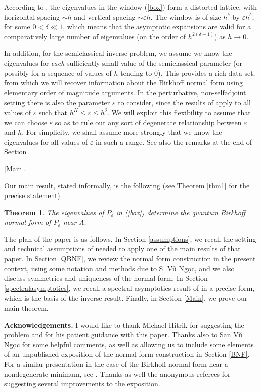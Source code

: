 \documentclass[12pt,lettersize]{article}
\renewcommand{\epsilon}{\varepsilon}
\theoremstyle{plain}%
\newtheorem{theorem}{Theorem}
\numberwithin{theorem}{section}
\numberwithin{equation}{section}
\theoremstyle{definition}
\theoremstyle{remark}
\begin{document}
According to \cite{HSV}, the eigenvalues in the window (\ref{box}) form a distorted lattice, with horizontal spacing $\sim h$ and vertical spacing $\sim \epsilon h$. The window is of size $h^\delta$ by $\epsilon h^\delta$, for some $0 < \delta \ll 1$, which means that the asymptotic expansions are valid for a comparatively large number of eigenvalues (on the order of $h^{2(\delta-1)}$) as $h \to 0$. 

In addition, for the semiclassical inverse problem, we assume we know the eigenvalues for \textit{each} sufficiently small value of the semiclassical parameter (or possibly for a sequence of values of $h$ tending to 0). This provides a rich data set, from which we will recover information about the Birkhoff normal form using elementary order of magnitude arguments. In the perturbative, non-selfadjoint setting there is also the parameter $\epsilon$ to consider, since the results of \cite{HSV} apply to all values of $\epsilon$ such that $h^K \leq \epsilon \leq h^\delta$. We will exploit this flexibility to assume that we can choose $\epsilon$ so as to rule out any sort of degenerate relationship between $\epsilon$ and $h$. For simplicity, we shall assume more strongly that we know the eigenvalues for all values of $\epsilon$ in such a range. See also the remarks at the end of Section {\ref{Main}.

Our main result, stated informally, is the following (see Theorem \ref{thm1} for the precise statement)
\begin{theorem}
The eigenvalues of $P_\epsilon$ in (\ref{box}) determine the quantum Birkhoff normal form of $P_\epsilon$ near $\Lambda$. 
\end{theorem}

The plan of the paper is as follows. In Section \ref{assumptions}, we recall the setting and technical assumptions of \cite{HSV} needed to apply one of the main results of that paper. In Section \ref{QBNF}, we review the normal form construction in the present context, using some notation and methods due to S. V\~u Ng\d oc, and we also discuss symmetries and uniqueness of the normal form. In Section \ref{spectralasymptotics}, we recall a spectral asymptotics result of \cite{HSV} in a precise form, which is the basis of the inverse result. Finally, in Section \ref{Main}, we prove our main theorem.

{\bf Acknowledgements.} I would like to thank Michael Hitrik for suggesting the problem and for his patient guidance with this paper. Thanks also to San V\~ u Ng\d oc for some helpful comments, as well as allowing us to include some elements of an unpublished exposition of the normal form construction in Section \ref{BNF}. For a similar presentation in the case of the Birkhoff normal form near a nondegenerate minimum, see \cite{CN}. Thanks 
 as well the anonymous referees for suggesting several improvements to the exposition.

}
\end{document}
